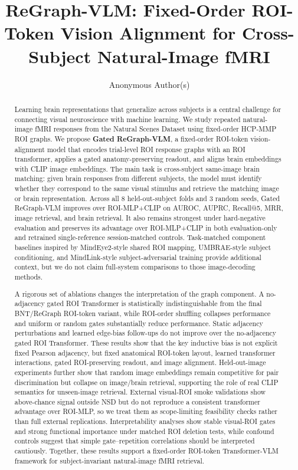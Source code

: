 \documentclass{article}
\title{ReGraph-VLM: Fixed-Order ROI-Token Vision Alignment for Cross-Subject Natural-Image fMRI}
\author{%
  Anonymous Author(s)
}
\begin{document}
\maketitle

\begin{abstract}
Learning brain representations that generalize across subjects is a central challenge for connecting visual neuroscience with machine learning. We study repeated natural-image fMRI responses from the Natural Scenes Dataset using fixed-order HCP-MMP ROI graphs. We propose \textbf{Gated ReGraph-VLM}, a fixed-order ROI-token vision-alignment model that encodes trial-level ROI response graphs with an ROI transformer, applies a gated anatomy-preserving readout, and aligns brain embeddings with CLIP image embeddings. The main task is cross-subject same-image brain matching: given brain responses from different subjects, the model must identify whether they correspond to the same visual stimulus and retrieve the matching image or brain representation. Across all 8 held-out-subject folds and 3 random seeds, Gated ReGraph-VLM improves over ROI-MLP+CLIP on AUROC, AUPRC, Recall@5, MRR, image retrieval, and brain retrieval. It also remains strongest under hard-negative evaluation and preserves its advantage over ROI-MLP+CLIP in both evaluation-only and retrained single-reference session-matched controls. Task-matched component baselines inspired by MindEye2-style shared ROI mapping, UMBRAE-style subject conditioning, and MindLink-style subject-adversarial training provide additional context, but we do not claim full-system comparisons to those image-decoding methods.

A rigorous set of ablations changes the interpretation of the graph component. A no-adjacency gated ROI Transformer is statistically indistinguishable from the final BNT/ReGraph ROI-token variant, while ROI-order shuffling collapses performance and uniform or random gates substantially reduce performance. Static adjacency perturbations and learned edge-bias follow-ups do not improve over the no-adjacency gated ROI Transformer. These results show that the key inductive bias is not explicit fixed Pearson adjacency, but fixed anatomical ROI-token layout, learned transformer interactions, gated ROI-preserving readout, and image alignment. Held-out-image experiments further show that random image embeddings remain competitive for pair discrimination but collapse on image/brain retrieval, supporting the role of real CLIP semantics for unseen-image retrieval. External visual-ROI smoke validations show above-chance signal outside NSD but do not reproduce a consistent transformer advantage over ROI-MLP, so we treat them as scope-limiting feasibility checks rather than full external replications. Interpretability analyses show stable visual-ROI gates and strong functional importance under matched ROI deletion tests, while confound controls suggest that simple gate--repetition correlations should be interpreted cautiously. Together, these results support a fixed-order ROI-token Transformer-VLM framework for subject-invariant natural-image fMRI retrieval.
\end{abstract}
\end{document}
